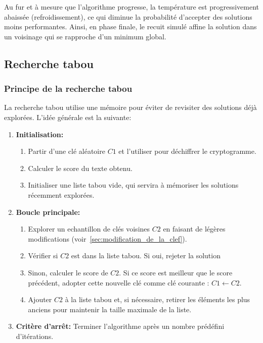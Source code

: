 \documentclass[a4paper]{article}
\begin{document}
Au fur et à mesure que l'algorithme progresse, la température est progressivement abaissée (refroidissement), ce qui diminue la probabilité d'accepter des solutions moins performantes. Ainsi, en phase finale, le recuit simulé affine la solution dans un voisinage qui se rapproche d'un minimum global.


\subsection{Recherche tabou}


\subsubsection{Principe de la recherche tabou}

La recherche tabou utilise une mémoire pour éviter de revisiter des solutions déjà explorées. L'idée générale est la suivante:

\begin{enumerate}
    \item \textbf{Initialisation:}
    \begin{enumerate}
        \item Partir d'une clé aléatoire $C1$ et l'utiliser pour déchiffrer le cryptogramme.
        \item Calculer le score du texte obtenu.
        \item Initialiser une liste tabou vide, qui servira à mémoriser les solutions récemment explorées.
    \end{enumerate}
    \item \textbf{Boucle principale:}
    \begin{enumerate}[label= (\alph*)]
        \item Explorer un echantillon de clés voisines $C2$ en faisant de légères modifications (voir~\ref{sec:modification_de_la_clef}).
        \item Vérifier si $C2$ est dans la liste tabou. Si oui, rejeter la solution
        \item Sinon, calculer le score de $C2$. Si ce score est meilleur que le score précédent, adopter cette nouvelle clé comme clé courante : $C1 \leftarrow C2$.
        \item Ajouter $C2$ à la liste tabou et, si nécessaire, retirer les éléments les plus anciens pour maintenir la taille maximale de la liste.
    \end{enumerate}
    \item \textbf{Critère d'arrêt:} Terminer l'algorithme après un nombre prédéfini d'itérations.
\end{enumerate}
\end{document}

